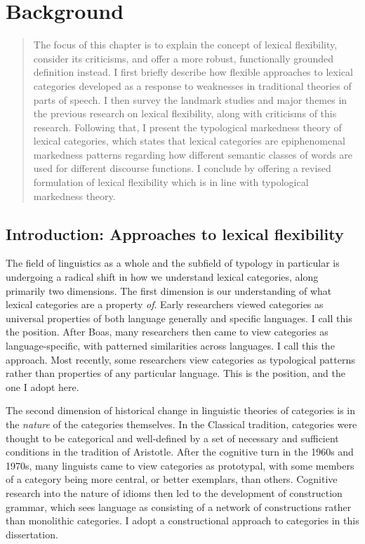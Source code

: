 \chapter{Background}
\label{ch:background}

\blockquote{The focus of this chapter is to explain the concept of lexical flexibility, consider its criticisms, and offer a more robust, functionally grounded definition instead. I first briefly describe how flexible approaches to lexical categories developed as a response to weaknesses in traditional theories of parts of speech. I then survey the landmark studies and major themes in the previous research on lexical flexibility, along with criticisms of this research. Following that, I present the typological markedness theory of lexical categories, which states that lexical categories are epiphenomenal markedness patterns regarding how different semantic classes of words are used for different discourse functions. I conclude by offering a revised formulation of lexical flexibility which is in line with typological markedness theory.}

\section{Introduction: Approaches to lexical flexibility}
\label{sec:2.1}

The field of linguistics as a whole and the subfield of typology in particular is undergoing a radical shift in how we understand lexical categories, along primarily two dimensions. The first dimension is our understanding of what lexical categories are a property \emph{of}. Early researchers viewed categories as universal properties of both language generally and specific languages. I call this the  position. After Boas, many researchers then came to view categories as language-specific, with patterned similarities across languages. I call this the  approach. Most recently, some researchers view categories as typological patterns rather than properties of any particular language. This is the  position, and the one I adopt here.

The second dimension of historical change in linguistic theories of categories is in the \emph{nature} of the categories themselves. In the Classical tradition, categories were thought to be categorical and well-defined by a set of necessary and sufficient conditions in the tradition of Aristotle. After the cognitive turn in the 1960s and 1970s, many linguists came to view categories as prototypal, with some members of a category being more central, or better exemplars, than others. Cognitive research into the nature of idioms then led to the development of construction grammar, which sees language as consisting of a network of constructions rather than monolithic categories. I adopt a constructional approach to categories in this dissertation.

